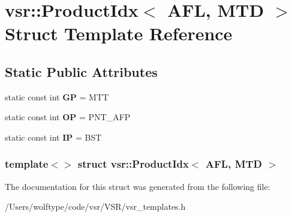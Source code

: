\hypertarget{structvsr_1_1_product_idx_3_01_a_f_l_00_01_m_t_d_01_4}{\section{vsr\-:\-:Product\-Idx$<$ A\-F\-L, M\-T\-D $>$ Struct Template Reference}
\label{structvsr_1_1_product_idx_3_01_a_f_l_00_01_m_t_d_01_4}
}
\subsection*{Static Public Attributes}
\begin{DoxyCompactItemize}
\item 
\hypertarget{structvsr_1_1_product_idx_3_01_a_f_l_00_01_m_t_d_01_4_a491b50a90aaef33ab324cb3ccdb547f5}{static const int {\bfseries G\-P} = M\-T\-T}\label{structvsr_1_1_product_idx_3_01_a_f_l_00_01_m_t_d_01_4_a491b50a90aaef33ab324cb3ccdb547f5}

\item 
\hypertarget{structvsr_1_1_product_idx_3_01_a_f_l_00_01_m_t_d_01_4_adee003b7b105ee4d76db96dedba43fac}{static const int {\bfseries O\-P} = P\-N\-T\-\_\-\-A\-F\-P}\label{structvsr_1_1_product_idx_3_01_a_f_l_00_01_m_t_d_01_4_adee003b7b105ee4d76db96dedba43fac}

\item 
\hypertarget{structvsr_1_1_product_idx_3_01_a_f_l_00_01_m_t_d_01_4_aa7106d293d8ddf62391e4bb679bad275}{static const int {\bfseries I\-P} = B\-S\-T}\label{structvsr_1_1_product_idx_3_01_a_f_l_00_01_m_t_d_01_4_aa7106d293d8ddf62391e4bb679bad275}

\end{DoxyCompactItemize}
\subsubsection*{template$<$$>$ struct vsr\-::\-Product\-Idx$<$ A\-F\-L, M\-T\-D $>$}



The documentation for this struct was generated from the following file\-:\begin{DoxyCompactItemize}
\item 
/\-Users/wolftype/code/vsr/\-V\-S\-R/vsr\-\_\-templates.\-h\end{DoxyCompactItemize}
